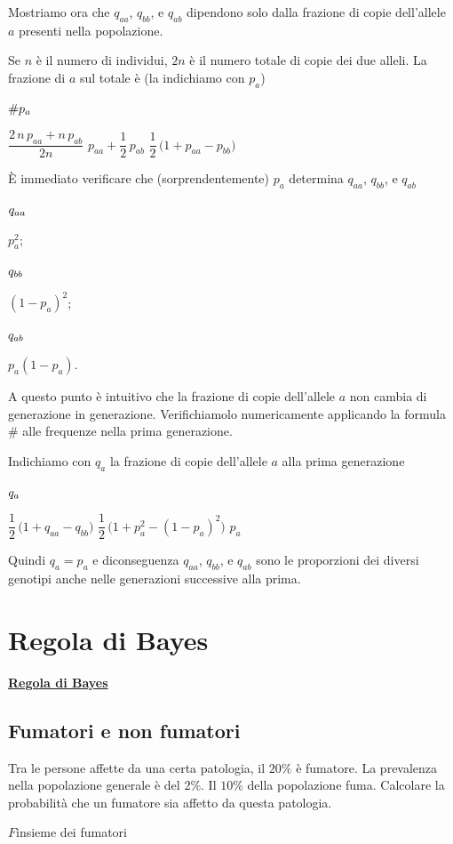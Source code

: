 \documentclass[12pt,openany]{book}
\theoremstyle{mio}
\theoremstyle{liscio}
\begin{document}
\def\ceq#1#2#3{\parbox{12ex}{$\displaystyle #1$}\medrel{#2}$\displaystyle  #3$}

Mostriamo ora che $q_{aa}$, $q_{bb}$, e $q_{ab}$ dipendono solo dalla frazione di copie dell'allele $a$ presenti nella popolazione. 

Se $n$ \`e il numero di individui, $2n$ è il numero totale di copie dei due alleli. La frazione di $a$ sul totale è (la indichiamo con $p_a$)

\ceq{\#\hfill p_a}{=}{\dfrac{2\,n\,p_{aa}+n\,p_{ab}}{2n}}
\medrel{=}$p_{aa}+\dfrac12\,p_{ab}$
\medrel{=}$\dfrac12\,\big(1+p_{aa}-p_{bb}\big)$

È immediato verificare che (sorprendentemente) $p_a$ determina  $q_{aa}$, $q_{bb}$, e $q_{ab}$

\ceq{\hfill q_{aa}}{=}{p_a^2};
\ceq{\hfill q_{bb}}{=}{(1-p_a)^2};
\ceq{\hfill q_{ab}}{=}{p_a(1-p_a)}.

A questo punto è intuitivo che la frazione di copie dell'allele $a$ non cambia di generazione in generazione. Verifichiamolo numericamente applicando la formula $\#$ alle frequenze nella prima generazione.

Indichiamo con $q_a$ la frazione di copie dell'allele $a$ alla prima generazione

\ceq{\hfill q_a}{=}{\dfrac12\,\big(1+q_{aa}-q_{bb}\big)}
\medrel{=}$\dfrac12\,\big(1+p^2_{a}-(1-p_{a})^2\big)$
\medrel{=}$p_a$

Quindi $q_a=p_a$ e diconseguenza $q_{aa}$, $q_{bb}$, e $q_{ab}$ sono le proporzioni dei diversi genotipi anche nelle generazioni successive alla prima.


\hfill{}\clearpage\section{Regola di Bayes}
\label{Bayes}
\hfill\textbf{{\color{brown}\hyperref[RegolaBayes]{Regola di Bayes} \faShare}}
\subsection{Fumatori e non fumatori}
\label{Fumatori_Bayes}


Tra le persone affette da una certa patologia, il $20\%$ è fumatore. La prevalenza nella popolazione generale è del $2\%$. Il $10\%$ della popolazione fuma. Calcolare la probabilità che un fumatore sia affetto da questa patologia.


$F$\hfill insieme dei fumatori
\end{document}
